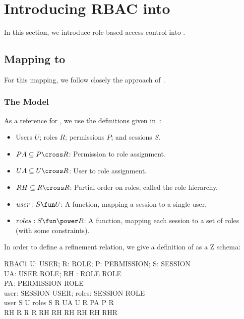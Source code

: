 
\section{Introducing RBAC into \corbasec} \label{sec:rbac}

\vspace{2ex}

\noindent
In this section, we introduce role-based access control into \corbasec.


\subsection{Mapping \rbaci{} to \corbasec}

For this mapping, we follow closely the approach
of~\cite{beznosov.ea:framework:1999}.

\subsubsection{The \rbaci{} Model}
As a reference for \rbaci, we use the definitions given
in~\cite{sandhu.ea:RBAC:1996}:
\begin{itemize}
\item Users $U$; roles $R$; permissions $P$; and sessions $S$.
\item $PA \subseteq P \cross R$: Permission to role assignment.
\item $UA \subseteq U \cross R$: User to role assignment.
\item $RH \subseteq R \cross R$: Partial order on roles, called the role
  hierarchy.
\item $user: S \fun U$: A function, mapping a session to a single user.
\item $roles: S \fun \power R$: A function, mapping each session to a set of
  roles (with some constraints).
\end{itemize}
In order to define a refinement relation, we give a definition of \rbaci{} as a
Z schema:
\begin{zed}
\end{zed}
\begin{schema}{RBAC1}
  U: \power USER; R: \power ROLE; P: \power PERMISSION; S: \power SESSION \\
  UA: USER \rel ROLE; RH : ROLE \rel ROLE \\
  PA: PERMISSION \rel ROLE \\
  user: SESSION \pfun USER; roles: SESSION \pfun \power ROLE \\
  \where
  user \in S \fun U \land roles \in S \fun \power R \land UA \in U \rel R \land
  PA \in P \rel R \\ 
  RH \in R \rel R \land \id R \subseteq RH \land RH \comp RH \subseteq RH \land
  RH \cap RH\inv \subseteq \id R \\ 
\end{schema}

